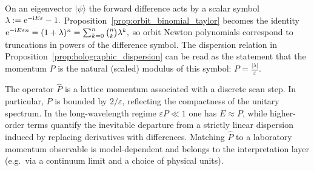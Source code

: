\begin{remark}
On an eigenvector $|\psi\rangle$ the forward difference acts by a scalar symbol
$
\lambda:=\mathrm{e}^{-\mathrm{i} E\varepsilon}-1.
$
Proposition~\ref{prop:orbit_binomial_taylor} becomes the identity
$
\mathrm{e}^{-\mathrm{i} E\varepsilon n}=(1+\lambda)^n=\sum_{k=0}^{n}\binom{n}{k}\lambda^k,
$
so orbit Newton polynomials correspond to truncations in powers of the difference symbol.
The dispersion relation in Proposition~\ref{prop:holographic_dispersion} can be read as the statement that the momentum $P$ is the natural (scaled) modulus of this symbol:
$
P=\frac{|\lambda|}{\varepsilon}.
$
\end{remark}

\begin{remark}
The operator $\widehat{P}$ is a lattice momentum associated with a discrete scan step.
In particular, $P$ is bounded by $2/\varepsilon$, reflecting the compactness of the unitary spectrum.
In the long-wavelength regime $\varepsilon P\ll 1$ one has $E\approx P$, while higher-order terms quantify the inevitable departure from a strictly linear dispersion induced by replacing derivatives with differences.
Matching $\widehat{P}$ to a laboratory momentum observable is model-dependent and belongs to the interpretation layer (e.g.\ via a continuum limit and a choice of physical units).
\end{remark}
